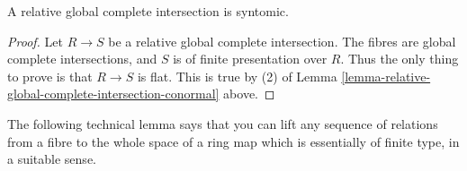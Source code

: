 \begin{lemma}
\label{lemma-relative-global-complete-intersection}
A relative global complete intersection is syntomic.
\end{lemma}

\begin{proof}
Let $R \to S$ be a relative global complete intersection.
The fibres are global complete intersections, and
$S$ is of finite presentation over $R$.
Thus the only thing to prove is that $R \to S$ is flat.
This is true by (2) of
Lemma \ref{lemma-relative-global-complete-intersection-conormal} above.
\end{proof}


\noindent
The following technical lemma says that you can lift any sequence
of relations from a fibre to the whole space of a ring
map which is essentially of finite type, in a suitable sense.

